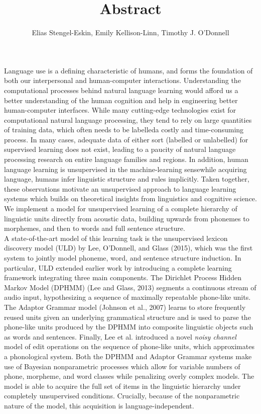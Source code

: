 \documentclass[12pt,letterpaper]{article}
\title{\vspace{-1.5cm} Abstract}
\author{Elias Stengel-Eskin, Emily Kellison-Linn, Timothy J. O'Donnell}
\begin{document}
\maketitle
Language use is a defining characteristic of humans, and forms the foundation of both our interpersonal and human-computer interactions.  Understanding the computational processes behind natural language learning would afford us a better understanding of the human cognition and help in engineering better human-computer interfaces. While many cutting-edge technologies exist for computational natural language processing, they tend to rely on large quantities of training data, which often needs to be labelled\textemdash a costly and time-consuming process. In many cases, adequate data of either sort (labelled or unlabelled) for supervised learning does not exist, leading to a paucity of natural language processing research on entire language families and regions. In addition, human language learning is unsupervised in the machine-learning sense\textemdash while acquiring language, humans infer linguistic structure and rules implicitly. Taken together, these observations motivate an unsupervised approach to  language learning systems which builds on theoretical insights from linguistics and cognitive science. We implement a model for unsupervised learning of a complete hierarchy of linguistic units directly from acoustic data, building upwards from phonemes to morphemes, and then to words and full sentence structure. \\

A state-of-the-art model of this learning task is the unsupervised lexicon discovery model (ULD) by Lee, O'Donnell, and Glass (2015), which was the first system to jointly model phoneme, word, and sentence structure induction. In particular, ULD extended earlier work by introducing a complete learning framework integrating three main components. The Dirichlet Process Hidden Markov Model (DPHMM) (Lee and Glass, 2013) segments a continuous stream of audio input, hypothesizing a sequence of maximally repeatable phone-like units. The Adaptor Grammar model (Johnson et al., 2007) learns to store frequently reused units given an underlying grammatical structure and is used to parse the phone-like units produced by the DPHMM into composite linguistic objects such as words and sentences. Finally, Lee et al. introduced a novel \textit{noisy channel} model of edit operations on the sequence of phone-like units, which approximates a phonological system. Both the DPHMM and Adaptor Grammar systems make use of Bayesian nonparametric processes which allow for variable numbers of phone, morpheme, and word classes while penalizing overly complex models. The model is able to acquire the full set of items in the linguistic hierarchy under completely unsupervised conditions. Crucially, because of the nonparametric nature of the model, this acquisition is language-independent. \\
\end{document}
